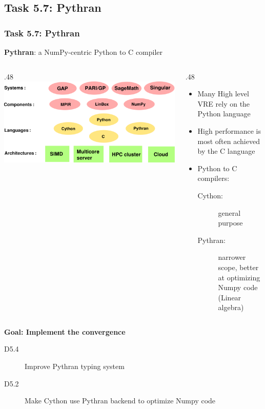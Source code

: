 \documentclass{beamer}
\begin{document}
\subsection{Task 5.7: Pythran}
\begin{frame}
  \frametitle{Task 5.7: Pythran}
  \begin{center}
    {\Large \textbf{Pythran}: a NumPy-centric Python to C compiler}
  \end{center}
  \begin{columns}
    \begin{column}
      {.48\textwidth }
          \includegraphics[width=\textwidth]{software_stack}
    \end{column}
    \begin{column}
      {.48\textwidth }
  \begin{itemize}
  \item Many High level VRE rely on the Python language
  \item High performance is most often achieved  by the C language\pause
  \item Python to C compilers: 
    \begin{description}
    \item[Cython:] general purpose
    \item[Pythran:] narrower scope, better at optimizing Numpy code (Linear algebra)
    \end{description}
  \end{itemize}
    \end{column}
  \end{columns}
\pause
  \begin{center}
    \textbf{Goal: Implement the convergence}

    \begin{description}
      \item[D5.4] Improve Pythran typing system
      \item[D5.2] Make Cython use Pythran backend to optimize Numpy code
    \end{description}
  \end{center}

\end{frame}
\end{document}
